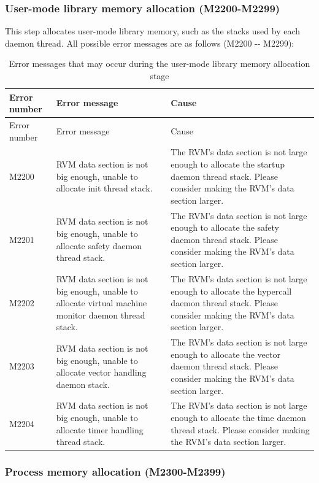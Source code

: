 \subsubsection{User-mode library memory allocation (M2200-M2299)}\label{subsubsec:5-6-6-3}

This step allocates user-mode library memory, such as the stacks used by each daemon thread. All possible error messages are as follows (M2200
-\/- M2299):

\begin{xltabular}{\textwidth}{@{}>{\hsize\raggedright\arraybackslash}X>{\hsize\raggedright\arraybackslash}X>{\hsize\raggedright\arraybackslash}X@{}}
\caption{Error messages that may occur during the user-mode library memory allocation stage}\label{tab:5-25}\\
\toprule
Error number & Error message & Cause\tabularnewline
\endfirsthead
\toprule
Error number & Error message & Cause\tabularnewline
\midrule
\endhead
\bottomrule
\endlastfoot
M2200 & RVM data section is not big enough, unable to allocate init
thread stack. &
The RVM's data section is not large enough to allocate the startup daemon thread stack. Please consider making the RVM's data section larger.\tabularnewline
M2201 & RVM data section is not big enough, unable to allocate safety
daemon thread stack. &
The RVM's data section is not large enough to allocate the safety daemon thread stack. Please consider making the RVM's data section larger.\tabularnewline
M2202 & RVM data section is not big enough, unable to allocate virtual
machine monitor daemon thread stack. &
The RVM's data section is not large enough to allocate the hypercall daemon thread stack. Please consider making the RVM's data section larger.\tabularnewline
M2203 & RVM data section is not big enough, unable to allocate vector
handling daemon stack. &
The RVM's data section is not large enough to allocate the vector daemon thread stack. Please consider making the RVM's data section larger.\tabularnewline
M2204 & RVM data section is not big enough, unable to allocate timer
handling thread stack. &
The RVM's data section is not large enough to allocate the time daemon thread stack. Please consider making the RVM's data section larger.\tabularnewline
\end{xltabular}

\subsubsection{Process memory allocation (M2300-M2399)}\label{subsubsec:5-6-6-4}

